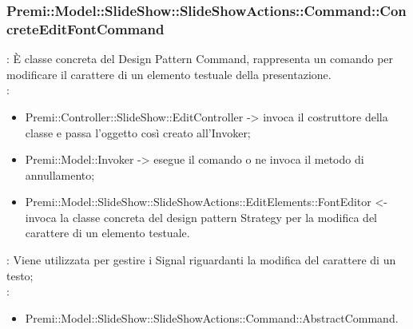 {                    \subsubsection{Premi::Model::SlideShow::SlideShowActions::Command::ConcreteEditFontCommand}{
				\textbf{\tipo}: È classe concreta del Design Pattern Command, rappresenta un comando per modificare il carattere di un elemento testuale della presentazione.\\	
				\textbf{\relaz}: 
				\begin{itemize}
					\item Premi::Controller::SlideShow::EditController -> invoca il costruttore della classe e passa l’oggetto così creato all’Invoker;
                    \item Premi::Model::Invoker -> esegue il comando o ne invoca il metodo di annullamento;
                    \item Premi::Model::SlideShow::SlideShowActions::EditElements::FontEditor <- invoca la classe concreta del design pattern Strategy per la modifica del carattere di un elemento testuale.
				\end{itemize}	
                \textbf{\interfacce}: Viene utilizzata per gestire i Signal riguardanti la modifica del carattere di un testo;\\
                \textbf{\base}: 
                    \begin{itemize}
                    \item Premi::Model::SlideShow::SlideShowActions::Command::AbstractCommand.
                    \end{itemize}
                    }
                    }
